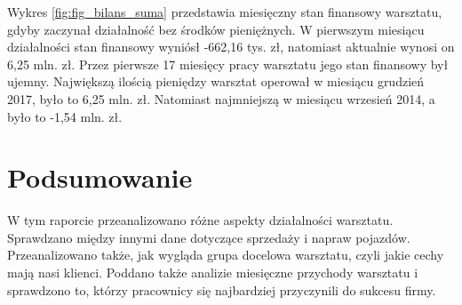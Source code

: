 \documentclass{article}\usepackage[]{graphicx}\usepackage[]{xcolor}
\begin{document}
Wykres \ref{fig:fig_bilans_suma} przedstawia miesięczny stan finansowy warsztatu, gdyby zaczynał działalność bez środków pieniężnych. W pierwszym miesiącu działalności stan finansowy wyniósł -662,16 tys. zł, natomiast aktualnie wynosi on 6,25 mln. zł. Przez pierwsze 17 miesięcy pracy warsztatu jego stan finansowy był ujemny.
Największą ilością pieniędzy warsztat operował w miesiącu grudzień 2017, było to 6,25 mln. zł.
Natomiast najmniejszą w miesiącu wrzesień 2014, a było to -1,54 mln. zł.

\section{Podsumowanie}
W tym raporcie przeanalizowano różne aspekty działalności warsztatu. Sprawdzano między innymi dane dotyczące sprzedaży i napraw pojazdów. Przeanalizowano także, jak wygląda grupa docelowa warsztatu, czyli jakie cechy mają nasi klienci. Poddano także analizie miesięczne przychody warsztatu i sprawdzono to, którzy pracownicy się najbardziej przyczynili do sukcesu firmy.
\end{document}

